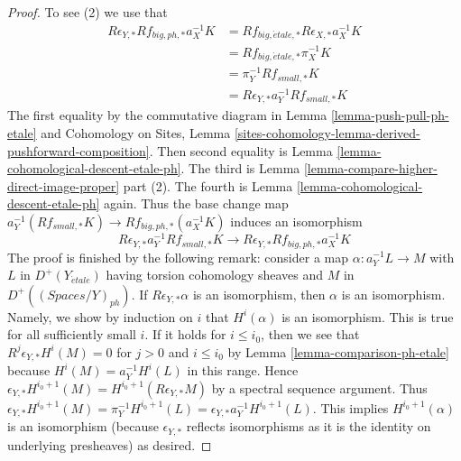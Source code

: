\documentclass{stacks-project}
\theoremstyle{plain}
\theoremstyle{definition}
\theoremstyle{remark}
\numberwithin{equation}{subsection}
\def\etale{{\acute{e}tale}}
\begin{document}
\begin{proof}
\medskip\noindent
To see (2) we use that
\begin{align*}
R\epsilon_{Y, *}Rf_{big, ph, *}a_X^{-1}K
& =
Rf_{big, \etale, *}R\epsilon_{X, *}a_X^{-1}K \\
& =
Rf_{big, \etale, *}\pi_X^{-1}K \\
& =
\pi_Y^{-1}Rf_{small, *}K \\
& =
R\epsilon_{Y, *} a_Y^{-1}Rf_{small, *}K
\end{align*}
The first equality by the commutative diagram in
Lemma \ref{lemma-push-pull-ph-etale}
and Cohomology on Sites, Lemma
\ref{sites-cohomology-lemma-derived-pushforward-composition}.
Then second equality is Lemma \ref{lemma-cohomological-descent-etale-ph}.
The third is
Lemma \ref{lemma-compare-higher-direct-image-proper} part (2).
The fourth is Lemma \ref{lemma-cohomological-descent-etale-ph} again.
Thus the base change map
$a_Y^{-1}(Rf_{small, *}K) \to Rf_{big, ph, *}(a_X^{-1}K)$
induces an isomorphism
$$
R\epsilon_{Y, *}a_Y^{-1}Rf_{small, *}K \to
R\epsilon_{Y, *}Rf_{big, ph, *}a_X^{-1}K
$$
The proof is finished by the following remark: consider a map
$\alpha : a_Y^{-1}L \to M$ with $L$ in $D^+(Y_\etale)$
having torsion cohomology sheaves
and $M$ in $D^+((\textit{Spaces}/Y)_{ph})$. If
$R\epsilon_{Y, *}\alpha$ is an isomorphism, then $\alpha$ is an isomorphism.
Namely, we show by induction on $i$ that $H^i(\alpha)$ is an isomorphism.
This is true for all sufficiently small $i$.
If it holds for $i \leq i_0$, then we see that
$R^j\epsilon_{Y, *}H^i(M) = 0$ for $j > 0$ and $i \leq i_0$
by Lemma \ref{lemma-comparison-ph-etale}
because $H^i(M) = a_Y^{-1}H^i(L)$ in this range.
Hence $\epsilon_{Y, *}H^{i_0 + 1}(M) = H^{i_0 + 1}(R\epsilon_{Y, *}M)$
by a spectral sequence argument.
Thus $\epsilon_{Y, *}H^{i_0 + 1}(M) = \pi_Y^{-1}H^{i_0 + 1}(L) =
\epsilon_{Y, *}a_Y^{-1}H^{i_0 + 1}(L)$.
This implies $H^{i_0 + 1}(\alpha)$ is an isomorphism
(because $\epsilon_{Y, *}$ reflects isomorphisms as it is the
identity on underlying presheaves) as desired.
\end{proof}
\end{document}
